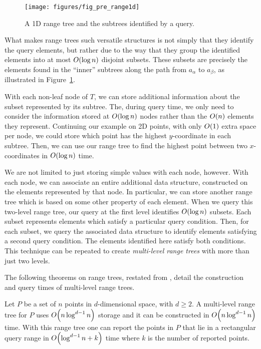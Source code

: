 \begin{figure}
\begin{center}
  \texttt{[image: figures/fig\_pre\_range1d]}
  \caption{A 1D range tree and the subtrees identified by a query.}
  \label{fig:pre:range1d}
\end{center}
\end{figure}

What makes range trees such versatile structures is not simply that they identify the query elements, but rather due to the way that they group the identified elements into at most $O\!\left(\log{n}\right)$ disjoint subsets. These subsets are precisely the elements found in the ``inner'' subtrees along the path from $a_\alpha$ to $a_\beta$, as illustrated in Figure~\ref{fig:pre:range1d}.

With each non-leaf node of $T$, we can store additional information about the subset represented by its subtree.  The, during query time, we only need to consider the information stored at $O\!\left(\log{n}\right)$ nodes rather than the $O\!\left(n\right)$ elements they represent. Continuing our example on 2D points, with only $O\!\left(1\right)$ extra space per node, we could store which point has the highest $y$-coordinate in each subtree.  Then, we can use our range tree to find the highest point between two $x$-coordinates in $O\!\left(\log{n}\right)$ time.

We are not limited to just storing simple values with each node, however. With each node, we can associate an entire additional data structure, constructed on the elements represented by that node. In particular, we can store another range tree which is based on some other property of each element.  When we query this two-level range tree, our query at the first level identifies $O\!\left(\log{n}\right)$ subsets. Each subset represents elements which satisfy a particular query condition. Then, for each subset, we query the associated data structure to identify elements satisfying a second query condition.  The elements identified here satisfy both conditions. This technique can be repeated to create \emph{multi-level range trees} with more than just two levels.

The following theorems on range trees, restated from \cite{debergch5}, detail the construction and query times of multi-level range trees.

\begin{theorem}
\label{th:rangetree}
Let $P$ be a set of $n$ points in $d$-dimensional space, with $d \geq 2$. A multi-level range tree for $P$ uses $O\!\left(n \log^{d-1}{n}\right)$ storage and it can be constructed in $O\!\left(n \log^{d-1}{n}\right)$ time. With this range tree one can report the points in $P$ that lie in a rectangular query range in $O\!\left(\log^{d-1}{n} + k\right)$ time where $k$ is the number of reported points.
\end{theorem}

